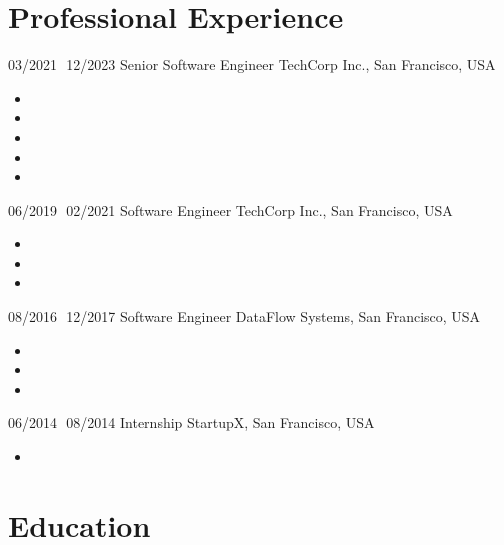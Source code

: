 \documentclass[]{friggeri-cv}
\begin{document}
\section{Professional Experience}
\vspace{-3mm}  
\begin{entrylist}
\entry
{03/2021\,\textendash\ 12/2023}
{Senior Software Engineer}
{TechCorp Inc., San Francisco, USA}
{
	\vspace{-3mm}
	\begin{itemize}[leftmargin=5mm]
		\item \lipsum[2][1-2]
		\item \lipsum[3][1-2]
		\item \lipsum[4][1-2]
		\item \lipsum[5][1-2]
		\item \lipsum[6][1-2]
	\end{itemize}
}
\entry
{06/2019\,\textendash\ 02/2021}
{Software Engineer}
{TechCorp Inc., San Francisco, USA}
{
	\vspace{-3mm}
	\begin{itemize}[leftmargin=5mm]
		\item \lipsum[7][1-2]
		\item \lipsum[8][1-2]
		\item \lipsum[9][1-2]
	\end{itemize}
}
\entry
{08/2016\,\textendash\ 12/2017}
{Software Engineer}
{DataFlow Systems, San Francisco, USA}
{
	\vspace{-3mm}
	\begin{itemize}[leftmargin=5mm]
		\item \lipsum[15][1-2]
		\item \lipsum[16][1-2]
		\item \lipsum[17][1-2]
	\end{itemize}
}
\entry
{06/2014\,\textendash\ 08/2014}
{Internship}
{StartupX, San Francisco, USA}
{
	\vspace{-3mm}
	\begin{itemize}[leftmargin=5mm]
		\item \lipsum[23][1-2]
	\end{itemize}
}
\end{entrylist}

\vspace{-9mm}
\section{Education}
\end{document}
